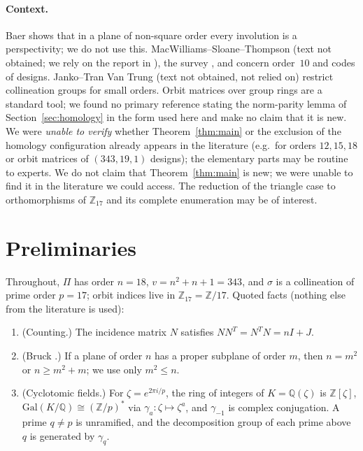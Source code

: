 \documentclass[11pt,a4paper]{article}
\theoremstyle{definition}
\newcommand{\ZZ}{\mathbb{Z}}
\newcommand{\QQ}{\mathbb{Q}}
\newcommand{\Zp}{\mathbb{Z}_{17}}
\begin{document}
\paragraph{Context.}
Baer \cite[Thm.~5, Cor.~6]{Baer46} shows that in a plane of non-square order every involution is a perspectivity; we do not use this.
MacWilliams--Sloane--Thompson \cite{MST73} (text not obtained; we rely on the report in \cite[Sec.~2]{LTS89}), the survey \cite{Lam91}, and \cite{AssmusKey92,Perrott16} concern order~$10$ and codes of designs. Janko--Tran Van Trung \cite{JankoTran81} (text not obtained, not relied on) restrict collineation groups for small orders.
Orbit matrices over group rings are a standard tool; we found no primary reference stating the norm-parity lemma of Section~\ref{sec:homology} in the form used here and make no claim that it is new.
We were \emph{unable to verify} whether Theorem~\ref{thm:main} or the exclusion of the homology configuration already appears in the literature (e.g.\ for orders $12,15,18$ or orbit matrices of $(343,19,1)$ designs); the elementary parts may be routine to experts. We do not claim that Theorem~\ref{thm:main} is new; we were unable to find it in the literature we could access. The reduction of the triangle case to orthomorphisms of $\ZZ_{17}$ and its complete enumeration may be of interest.

\section{Preliminaries}\label{sec:prelim}

Throughout, $\Pi$ has order $n=18$, $v=n^2+n+1=343$, and $\sigma$ is a collineation of prime order $p=17$; orbit indices live in $\Zp=\ZZ/17$.
Quoted facts (nothing else from the literature is used):
\begin{enumerate}[label=\textbf{Q\arabic*.},leftmargin=*,itemsep=0pt]
\item (Counting.) The incidence matrix $N$ satisfies $NN^{T}=N^{T}N=nI+J$.
\item (Bruck \cite[Lemma~3.1]{Bruck55}.) If a plane of order $n$ has a proper subplane of order $m$, then $n=m^2$ or $n\ge m^2+m$; we use only $m^2\le n$.
\item (Cyclotomic fields.) For $\zeta=e^{2\pi i/p}$, the ring of integers of $K=\QQ(\zeta)$ is $\ZZ[\zeta]$, $\mathrm{Gal}(K/\QQ)\cong(\ZZ/p)^{*}$ via $\gamma_a:\zeta\mapsto\zeta^a$, and $\gamma_{-1}$ is complex conjugation. A prime $q\ne p$ is unramified, and the decomposition group of each prime above $q$ is generated by $\gamma_q$.
\end{enumerate}
\end{document}
